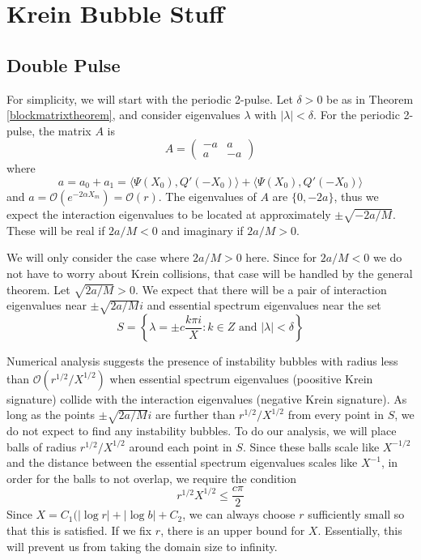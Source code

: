 \documentclass[thesis.tex]{subfiles}
\begin{document}
\chapter{Krein Bubble Stuff}

\section{Double Pulse}

For simplicity, we will start with the periodic 2-pulse. Let $\delta > 0$ be as in Theorem \ref{blockmatrixtheorem}, and consider eigenvalues $\lambda$ with $|\lambda| < \delta$. For the periodic 2-pulse, the matrix $A$ is
\[
A = \begin{pmatrix}
-a & a \\
a & -a
\end{pmatrix}
\]
where
\[
a = a_0 + a_1 = \langle \Psi(X_0), Q'(-X_0) \rangle + \langle \Psi(X_0), Q'(-X_0) \rangle
\]
and $a = \mathcal{O}(e^{-2\alpha X_m}) = \mathcal{O}(r)$. The eigenvalues of $A$ are $\{0, -2a\}$, thus we expect the interaction eigenvalues to be located at approximately $\pm \sqrt{-2a/M}$. These will be real if $2a/M < 0$ and imaginary if $2a/M > 0$. 

We will only consider the case where $2a/M > 0$ here. Since for $2a/M < 0$ we do not have to worry about Krein collisions, that case will be handled by the general theorem. Let $\sqrt{2a/M} > 0$. We expect that there will be a pair of interaction eigenvalues near $\pm \sqrt{2a/M} i$ and essential spectrum eigenvalues near the set 
\[
S = \left\{ \lambda = \pm c \frac{k \pi i}{X} : k \in Z \text{ and }|\lambda| < \delta  \right\} 
\]

Numerical analysis suggests the presence of instability bubbles with radius less than $\mathcal{O}(r^{1/2}/X^{1/2})$ when essential spectrum eigenvalues (poositive Krein signature) collide with the interaction eigenvalues (negative Krein signature). As long as the points $\pm \sqrt{2a/M} i$ are further than $r^{1/2}/X^{1/2}$ from every point in $S$, we do not expect to find any instability bubbles. To do our analysis, we will place balls of radius $r^{1/2}/X^{1/2}$ around each point in $S$. Since these balls scale like $X^{-1/2}$ and the distance between the essential spectrum eigenvalues scales like $X^{-1}$, in order for the balls to not overlap, we require the condition
\begin{equation}\label{rXcondition}
r^{1/2}X^{1/2} \leq \frac{c \pi}{2}
\end{equation}
Since $X = C_1 ( |\log r| + |\log b| + C_2$, we can always choose $r$ sufficiently small so that this is satisfied. If we fix $r$, there is an upper bound for $X$. Essentially, this will prevent us from taking the domain size to infinity.
\end{document}
